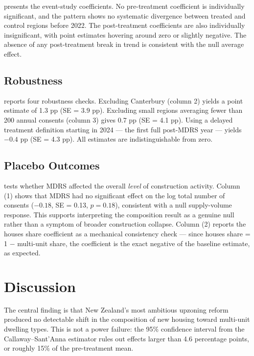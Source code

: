\documentclass[12pt]{article}
\begin{document}


 presents the event-study coefficients. No pre-treatment coefficient is individually significant, and the pattern shows no systematic divergence between treated and control regions before 2022. The post-treatment coefficients are also individually insignificant, with point estimates hovering around zero or slightly negative. The absence of any post-treatment break in trend is consistent with the null average effect.

\subsection{Robustness}



 reports four robustness checks. Excluding Canterbury (column 2) yields a point estimate of 1.3 pp (SE = 3.9 pp). Excluding small regions averaging fewer than 200 annual consents (column 3) gives 0.7 pp (SE = 4.1 pp). Using a delayed treatment definition starting in 2024 --- the first full post-MDRS year --- yields $-0.4$ pp (SE = 4.3 pp). All estimates are indistinguishable from zero.

\subsection{Placebo Outcomes}



 tests whether MDRS affected the overall \textit{level} of construction activity. Column (1) shows that MDRS had no significant effect on the log total number of consents ($-0.18$, SE = 0.13, $p = 0.18$), consistent with a null supply-volume response. This supports interpreting the composition result as a genuine null rather than a symptom of broader construction collapse. Column (2) reports the houses share coefficient as a mechanical consistency check --- since houses share = 1 $-$ multi-unit share, the coefficient is the exact negative of the baseline estimate, as expected.


\section{Discussion}
\label{sec:discussion}

The central finding is that New Zealand's most ambitious upzoning reform produced no detectable shift in the composition of new housing toward multi-unit dwelling types. This is not a power failure: the 95\% confidence interval from the Callaway--Sant'Anna estimator rules out effects larger than 4.6 percentage points, or roughly 15\% of the pre-treatment mean.
\end{document}
